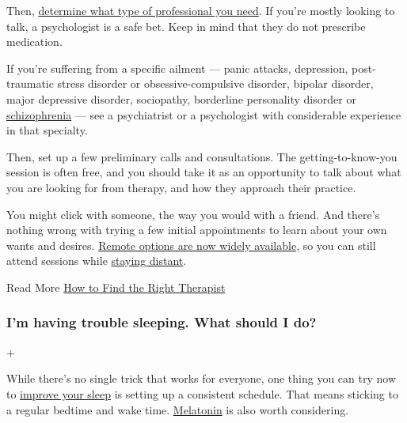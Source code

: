 Then,
\href{https://www.nytimes3xbfgragh.onion/2020/05/13/well/mind/prospective-therapist-interview-questions-online-virus.html}{determine
what type of professional you need}. If you're mostly looking to talk, a
psychologist is a safe bet. Keep in mind that they do not prescribe
medication.

If you're suffering from a specific ailment --- panic attacks,
depression, post-traumatic stress disorder or obsessive-compulsive
disorder, bipolar disorder, major depressive disorder, sociopathy,
borderline personality disorder or
\href{https://www.nytimes3xbfgragh.onion/2016/01/28/health/schizophrenia-cause-synaptic-pruning-brain-psychiatry.html}{schizophrenia}
--- see a psychiatrist or a psychologist with considerable experience in
that specialty.

Then, set up a few preliminary calls and consultations. The
getting-to-know-you session is often free, and you should take it as an
opportunity to talk about what you are looking for from therapy, and how
they approach their practice.

You might click with someone, the way you would with a friend. And
there's nothing wrong with trying a few initial appointments to learn
about your own wants and desires.
\href{https://www.nytimes3xbfgragh.onion/2020/05/13/well/mind/prospective-therapist-interview-questions-online-virus.html}{Remote
options are now widely available}, so you can still attend sessions
while
\href{https://www.nytimes3xbfgragh.onion/2020/07/09/well/mind/teletherapy-mental-health-coronavirus.html}{staying
distant}.

Read More
\href{https://www.nytimes3xbfgragh.onion/2017/07/17/smarter-living/how-to-find-the-right-therapist.html}{How
to Find the Right Therapist}

\hypertarget{im-having-trouble-sleeping-what-should-i-do}{%
\subsubsection{I'm having trouble sleeping. What should I
do?}\label{im-having-trouble-sleeping-what-should-i-do}}

+

While there's no single trick that works for everyone, one thing you can
try now to
\href{https://www.nytimes3xbfgragh.onion/2020/03/25/style/self-care/sleep-tips-benefits-coronavirus.html}{improve
your sleep} is setting up a consistent schedule. That means sticking to
a regular bedtime and wake time.
\href{https://www.nytimes3xbfgragh.onion/2020/04/24/well/melatonin-sleep-aid-coronavirus.html}{Melatonin}
is also worth considering.

